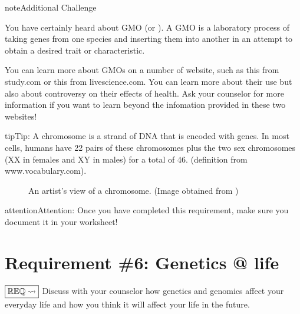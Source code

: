 \documentclass[letterpaper,10pt,english,openany,oneside]{sphinxmanual}
\let\sphinxpxdimen\pdfpxdimen\else\newdimen\sphinxpxdimen
\begin{document}
\begin{sphinxadmonition}{note}{Additional Challenge}

You have certainly heard about GMO (or ). A GMO is a laboratory process of taking genes from one species and inserting them into another in an attempt to obtain a desired trait or characteristic.

You can learn more about GMOs on a number of website, such as this  from study.com or this  from livescience.com. You can learn more about their use but also about controversy on their effects of health. Ask your counselor for more information if you want to learn beyond the infomation provided in these two websites!
\end{sphinxadmonition}

\begin{sphinxadmonition}{tip}{Tip:}
A chromosome is a strand of DNA that is encoded with genes. In most cells, humans have 22 pairs of these chromosomes plus the two sex chromosomes (XX in females and XY in males) for a total of 46. (definition from www.vocabulary.com).

\begin{figure}[H]
\centering
\capstart

\noindent\sphinxincludegraphics[width=500\sphinxpxdimen]{{chromosome}.jpg}
\caption{An artist’s view of a chromosome. (Image obtained from )}\label{\detokenize{requirement5:id1}}\end{figure}
\end{sphinxadmonition}

\begin{sphinxadmonition}{attention}{Attention:}
Once you have completed this requirement, make sure you document it in your worksheet!
\end{sphinxadmonition}


\chapter{Requirement \#6: Genetics @ life}
\label{\detokenize{requirement6:requirement-6-genetics-life}}\label{\detokenize{requirement6::doc}}
\(\boxed{\mathbb{REQ}\Large \rightsquigarrow}\) Discuss with your counselor how genetics and genomics affect your everyday life and how you think it will affect your life in the future.
\end{document}
